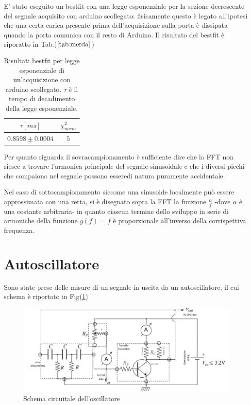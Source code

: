 \documentclass{article}
\begin{document}
    E' stato eseguito un bestfit con una legge esponenziale per la sezione decrescente
    del segnale acquisito con arduino scollegato: fisicamente questo è legato all'ipotesi 
    che una certa carica presente prima dell'acquisizione 
    sulla porta è dissipata quando la porta comunica con il resto di Arduino.
    Il risultato del bestfit è riporatto in Tab.($\ref{tab:merda}$)

        \begin{table}[H]
            \centering
            \begin{tabular}{cc}
                $\tau[ms]$ & $\chi^2_{norm}$\\
                \hline
                $0.8598\pm0.0004$ &$5$\\
            \end{tabular}
        \caption{Risultati bestfit per legge esponenziale di un'acquisizione 
                con arduino scollegato. $\tau$ è il tempo di decadimento della legge 
                esponenziale.}
        \label{tab:merda}
        \end{table}



    Per quanto riguarda il sovracampionamento è sufficiente dire che la 
    FFT non riesce a trovare l'armonica principale del segnale sinusoidale e 
    che i diversi picchi che compaiono nel segnale possono esseredi natura puramente
    accidentale.

    Nel caso di sottocampionamento siccome una sinusoide localmente può 
    essere approssimata con una retta, si è disegnato sopra la FFT la funzione
    $\frac{\alpha}{f}$ -dove $\alpha$ è una costante arbitraria-
    in quanto ciascun termine dello sviluppo in serie  di 
    armoniche della funzione $g(f)=f$ è proporzionale all'inverso della 
    corrispettiva frequenza.







\section{Autoscillatore}

    Sono state prese delle misure di un segnale in uscita da un autoscillatore, il cui schema è riportato in Fig(\ref{fig:circuitino_oscillante})
        \begin{figure}[H]
            \centering
            \includegraphics[scale=0.30]{FFT11/schema_circuitino.png}
            \caption{Schema circuitale dell'oscillatore}
            \label{fig:circuitino_oscillante}
        \end{figure}
\end{document}
